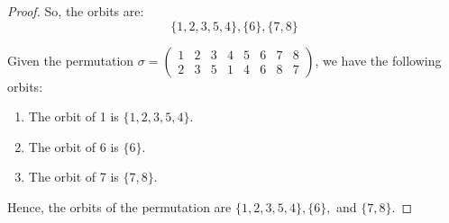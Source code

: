 \documentclass[12pt]{amsart}
\theoremstyle{definition}
\numberwithin{equation}{section}
\theoremstyle{plain}
\begin{document}
\begin{exercise}{3}
\begin{proof}
    So, the orbits are:
    \[ \{1, 2, 3, 5, 4\}, \{6\}, \{7, 8\} \]

    Given the permutation \(\sigma = \begin{pmatrix} 1&2&3&4&5&6&7&8\\ 2&3&5&1&4&6&8&7 \end{pmatrix}\), we have the following orbits:

\begin{enumerate}
    \item The orbit of 1 is \(\{1, 2, 3, 5, 4\}\).
    \item The orbit of 6 is \(\{6\}\).
    \item The orbit of 7 is \(\{7, 8\}\).
\end{enumerate}
    
    Hence, the orbits of the permutation are \(\{1, 2, 3, 5, 4\}, \{6\},\) and \(\{7, 8\}\).
    \end{proof}    
\end{exercise}
\vspace*{20pt}
\end{document}
